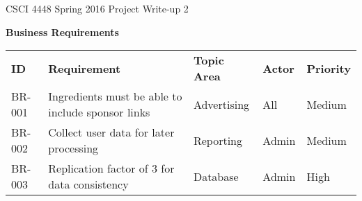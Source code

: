 \documentclass[12pt]{article}
\begin{document}
CSCI 4448 Spring 2016 \hfill Project Write-up 2\\

\hrulefill
\begin{center}
  \textbf{Business Requirements} \\
\begin{tabular}{ l  l  l  l  l  }
  \textbf{ID}  & \textbf{Requirement} & \textbf{Topic Area} & \textbf{Actor} & \textbf{Priority} \\  \rowcolor[gray]{.95} \hline
  BR-001 & Ingredients must be able to include sponsor links & Advertising & All & Medium \\  
  BR-002 & Collect user data for later processing & Reporting & Admin & Medium \\  \rowcolor[gray]{.95}
  BR-003 & Replication factor of 3 for data consistency & Database & Admin & High \\ 

\end{tabular}
\\
  \vspace{1cm}



\end{center}
\end{document}
